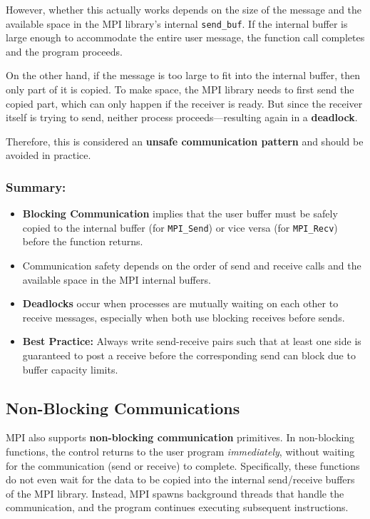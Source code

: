 \documentclass[12pt]{book}
\begin{document}
However, whether this actually works depends on the size of the message and the available space in the MPI library's internal \texttt{send\_buf}. If the internal buffer is large enough to accommodate the entire user message, the function call completes and the program proceeds.

On the other hand, if the message is too large to fit into the internal buffer, then only part of it is copied. To make space, the MPI library needs to first send the copied part, which can only happen if the receiver is ready. But since the receiver itself is trying to send, neither process proceeds—resulting again in a \textbf{deadlock}.

Therefore, this is considered an \textbf{unsafe communication pattern} and should be avoided in practice.

\subsubsection*{Summary:}

\begin{itemize}
    \item \textbf{Blocking Communication} implies that the user buffer must be safely copied to the internal buffer (for \texttt{MPI\_Send}) or vice versa (for \texttt{MPI\_Recv}) before the function returns.
    \item Communication safety depends on the order of send and receive calls and the available space in the MPI internal buffers.
    \item \textbf{Deadlocks} occur when processes are mutually waiting on each other to receive messages, especially when both use blocking receives before sends.
    \item \textbf{Best Practice:} Always write send-receive pairs such that at least one side is guaranteed to post a receive before the corresponding send can block due to buffer capacity limits.
\end{itemize}


\subsection{Non-Blocking Communications}

MPI also supports \textbf{non-blocking communication} primitives. In non-blocking functions, the control returns to the user program \textit{immediately}, without waiting for the communication (send or receive) to complete. Specifically, these functions do not even wait for the data to be copied into the internal send/receive buffers of the MPI library. Instead, MPI spawns background threads that handle the communication, and the program continues executing subsequent instructions.
\end{document}

